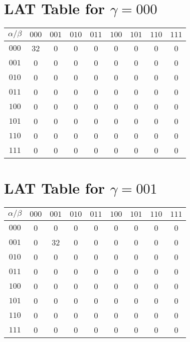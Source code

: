 \documentclass{article}
\begin{document}
\section*{LAT Table for $\gamma = 000$}\n\begin{center}
\begin{tabular}{c|cccccccc}
 $ \alpha / \beta $ & $000$ & $001$ & $010$ & $011$ & $100$ & $101$ & $110$ & $111$  \\
\midrule
$000$ & 32 & 0 & 0 & 0 & 0 & 0 & 0 & 0  \\
$001$ & 0 & 0 & 0 & 0 & 0 & 0 & 0 & 0  \\
$010$ & 0 & 0 & 0 & 0 & 0 & 0 & 0 & 0  \\
$011$ & 0 & 0 & 0 & 0 & 0 & 0 & 0 & 0  \\
$100$ & 0 & 0 & 0 & 0 & 0 & 0 & 0 & 0  \\
$101$ & 0 & 0 & 0 & 0 & 0 & 0 & 0 & 0  \\
$110$ & 0 & 0 & 0 & 0 & 0 & 0 & 0 & 0  \\
$111$ & 0 & 0 & 0 & 0 & 0 & 0 & 0 & 0  \\
\end{tabular}
\end{center}

\section*{LAT Table for $\gamma = 001$}\n\begin{center}
\begin{tabular}{c|cccccccc}
 $ \alpha / \beta $ & $000$ & $001$ & $010$ & $011$ & $100$ & $101$ & $110$ & $111$  \\
\midrule
$000$ & 0 & 0 & 0 & 0 & 0 & 0 & 0 & 0  \\
$001$ & 0 & 32 & 0 & 0 & 0 & 0 & 0 & 0  \\
$010$ & 0 & 0 & 0 & 0 & 0 & 0 & 0 & 0  \\
$011$ & 0 & 0 & 0 & 0 & 0 & 0 & 0 & 0  \\
$100$ & 0 & 0 & 0 & 0 & 0 & 0 & 0 & 0  \\
$101$ & 0 & 0 & 0 & 0 & 0 & 0 & 0 & 0  \\
$110$ & 0 & 0 & 0 & 0 & 0 & 0 & 0 & 0  \\
$111$ & 0 & 0 & 0 & 0 & 0 & 0 & 0 & 0  \\
\end{tabular}
\end{center}
\end{document}
